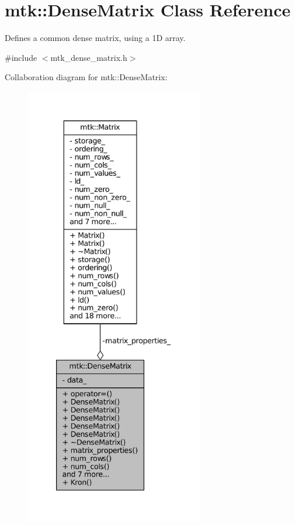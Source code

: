 \hypertarget{classmtk_1_1DenseMatrix}{\section{mtk\-:\-:Dense\-Matrix Class Reference}
\label{classmtk_1_1DenseMatrix}
}


Defines a common dense matrix, using a 1\-D array.  




{\ttfamily \#include $<$mtk\-\_\-dense\-\_\-matrix.\-h$>$}



Collaboration diagram for mtk\-:\-:Dense\-Matrix\-:
\nopagebreak
\begin{figure}[H]
\begin{center}
\leavevmode
\includegraphics[height=550pt]{classmtk_1_1DenseMatrix__coll__graph}
\end{center}
\end{figure}
